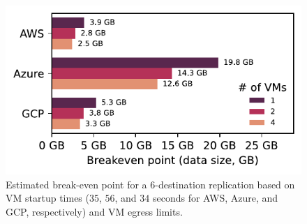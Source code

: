 \begin{figure}[t]
    \centering
    \includegraphics[width=0.7\linewidth]{figures/cloudflare_plot.pdf}
    \caption{Estimated break-even point for a 6-destination replication based on VM startup times ($35$, $56$, and $34$ seconds for AWS, Azure, and GCP, respectively) and VM egress limits. }
    \label{fig:size_threshold}
\end{figure}

